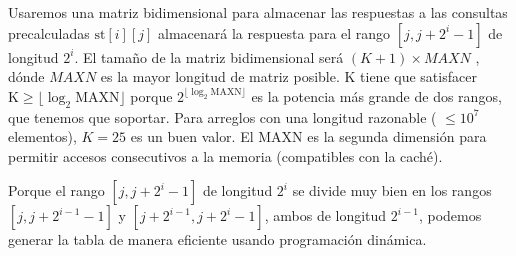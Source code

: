 Usaremos una matriz bidimensional para almacenar las respuestas a las consultas precalculadas $\text{st}[i][j]$ almacenará la respuesta para el rango  $[j, j + 2^i-1]$  de longitud $2^i$. El tamaño de la matriz bidimensional será $(K + 1) \times MAXN$ , dónde $MAXN$ es la mayor longitud de matriz posible. K tiene que satisfacer $\text{K} \ge \lfloor \log_2 \text{MAXN} \rfloor$ porque  $2^{\lfloor \log_2 \text{MAXN} \rfloor}$ es la potencia más grande de dos rangos, que tenemos que soportar. Para arreglos con una longitud razonable ( $\le 10^7$  elementos), $K = 25$ es un buen valor. El MAXN es la segunda dimensión para permitir accesos consecutivos a la memoria (compatibles con la caché). 

Porque el rango  $[j, j + 2^i - 1]$ de longitud $2^i$ se divide muy bien en los rangos  $[j, j + 2^{i - 1} - 1]$ y $[j + 2^{i - 1}, j + 2^i - 1]$, ambos de longitud $2^{i - 1}$, podemos generar la tabla de manera eficiente usando programación dinámica. 
